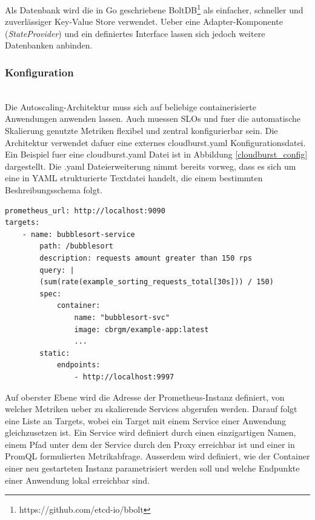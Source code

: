 \documentclass[runningheads]{llncs}
\begin{document}
Als Datenbank wird die in Go geschriebene BoltDB\footnote{https://github.com/etcd-io/bbolt} als einfacher, schneller und zuverlässiger Key-Value Store verwendet. Ueber eine Adapter-Komponente (\textit{StateProvider}) und ein definiertes Interface lassen sich jedoch weitere Datenbanken anbinden.

\subsubsection{Konfiguration} \label{configuration} \hfill\\

Die Autoscaling-Architektur muss sich auf beliebige containerisierte Anwendungen anwenden lassen. Auch muessen SLOs und fuer die automatische Skalierung genutzte Metriken flexibel und zentral konfigurierbar sein. Die Architektur verwendet dafuer eine externes cloudburst.yaml Konfigurationsdatei. Ein Beispiel fuer eine cloudburst.yaml Datei ist in Abbildung \ref{cloudburst_config} dargestellt. Die .yaml Dateierweiterung nimmt bereits vorweg, dass es sich um eine in YAML strukturierte Textdatei handelt, die einem bestimmten Beshreibungsschema folgt. \\

\begin{lstlisting}[label={cloudburst_config}, caption={Ein Beispiel fuer eine \textbf{cloudburst.yaml} Datei. Definiert wird ein Service mit einer Abfrage formuliert in PromQL, einer Angabe der Parameter fuer zu startende Container-Instanzen (\textit{spec}) und eine Liste von lokal erreichbaren Endpunkten (\textit{static})},captionpos=b]
prometheus_url: http://localhost:9090
targets:
	- name: bubblesort-service
		path: /bubblesort
		description: requests amount greater than 150 rps
		query: |
		(sum(rate(example_sorting_requests_total[30s])) / 150)
		spec:
			container:
				name: "bubblesort-svc"
				image: cbrgm/example-app:latest
				...
		static:
			endpoints:
				- http://localhost:9997
\end{lstlisting}

Auf oberster Ebene wird die Adresse der Prometheus-Instanz definiert, von welcher Metriken ueber zu skalierende Services abgerufen werden. Darauf folgt eine Liste an Targets, wobei ein Target mit einem Service einer Anwendung gleichzusetzen ist. Ein Service wird definiert durch einen einzigartigen Namen, einem Pfad unter dem der Service durch den Proxy erreichbar ist und einer in PromQL formulierten Metrikabfrage. Ausserdem wird definiert, wie der Container einer neu gestarteten Instanz parametrisiert werden soll und welche Endpunkte einer Anwendung lokal erreichbar sind.
\end{document}
